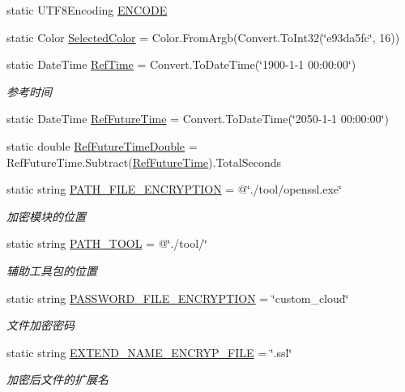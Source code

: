 \begin{DoxyCompactItemize}
static U\+T\+F8\+Encoding \hyperlink{classcustom__cloud_1_1_my_config_a7375e0108a1e2f18482f302fb907cbb8}{E\+N\+C\+O\+DE}
\item 
static Color \hyperlink{classcustom__cloud_1_1_my_config_ad5858d5294a8c3802911f95219efc954}{Selected\+Color} = Color.\+From\+Argb(Convert.\+To\+Int32(\char`\"{}e93da5fc\char`\"{}, 16))
\item 
static Date\+Time \hyperlink{classcustom__cloud_1_1_my_config_a4d8a94a3e8337ae1f7440b115db53f2c}{Ref\+Time} = Convert.\+To\+Date\+Time(\char`\"{}1900-\/1-\/1 00\+:00\+:00\char`\"{})
\begin{DoxyCompactList}\small\item\em 参考时间 \end{DoxyCompactList}\item 
static Date\+Time \hyperlink{classcustom__cloud_1_1_my_config_a8c33948c6b87971bf988155c62eb01b5}{Ref\+Future\+Time} = Convert.\+To\+Date\+Time(\char`\"{}2050-\/1-\/1 00\+:00\+:00\char`\"{})
\item 
static double \hyperlink{classcustom__cloud_1_1_my_config_a38c4a263baeb06c4674ee4f44e84c9fd}{Ref\+Future\+Time\+Double} = Ref\+Future\+Time.\+Subtract(\hyperlink{classcustom__cloud_1_1_my_config_a8c33948c6b87971bf988155c62eb01b5}{Ref\+Future\+Time}).Total\+Seconds
\item 
static string \hyperlink{classcustom__cloud_1_1_my_config_af35188be6f591a22f3fe0de189828c28}{P\+A\+T\+H\+\_\+\+F\+I\+L\+E\+\_\+\+E\+N\+C\+R\+Y\+P\+T\+I\+ON} = @\char`\"{}./tool/openssl.\+exe\char`\"{}
\begin{DoxyCompactList}\small\item\em 加密模块的位置 \end{DoxyCompactList}\item 
static string \hyperlink{classcustom__cloud_1_1_my_config_a88875f7b7174fd5583317879781f203c}{P\+A\+T\+H\+\_\+\+T\+O\+OL} = @\char`\"{}./tool/\char`\"{}
\begin{DoxyCompactList}\small\item\em 辅助工具包的位置 \end{DoxyCompactList}\item 
static string \hyperlink{classcustom__cloud_1_1_my_config_aecb4d68addc3af480b0454288457adb4}{P\+A\+S\+S\+W\+O\+R\+D\+\_\+\+F\+I\+L\+E\+\_\+\+E\+N\+C\+R\+Y\+P\+T\+I\+ON} = \char`\"{}custom\+\_\+cloud\char`\"{}
\begin{DoxyCompactList}\small\item\em 文件加密密码 \end{DoxyCompactList}\item 
static string \hyperlink{classcustom__cloud_1_1_my_config_ac0b2b00975340bc86bae5f08d6b4f64f}{E\+X\+T\+E\+N\+D\+\_\+\+N\+A\+M\+E\+\_\+\+E\+N\+C\+R\+Y\+P\+\_\+\+F\+I\+LE} = \char`\"{}.ssl\char`\"{}
\begin{DoxyCompactList}\small\item\em 加密后文件的扩展名 \end{DoxyCompactList}\end{DoxyCompactItemize}


